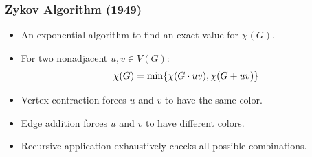 \documentclass{beamer}
\newcommand{\X}{\chi}
\DeclarePairedDelimiter{\set}{\{}{\}}
\begin{document}
\begin{frame}
  \frametitle{Zykov Algorithm (1949)}
  \begin{itemize}
  \item An exponential algorithm to find an exact value for \(\X(G)\).
  \item For two nonadjacent \(u,v\in V(G)\):
    \[\X(G)=\min\set{\X(G\cdot uv),\X(G+uv)}\]
  \item Vertex contraction forces \(u\) and \(v\) to have the same color.
  \item Edge addition forces \(u\) and \(v\) to have different colors.
  \item Recursive application exhaustively checks all possible combinations.
  \end{itemize}
\end{frame}
\end{document}
